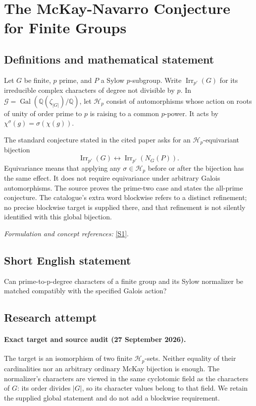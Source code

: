 \documentclass[11pt]{article}
\begin{document}
\section*{\texorpdfstring{The McKay-Navarro Conjecture for Finite Groups}{The McKay-Navarro Conjecture for Finite Groups}}\label{495}
\subsection{Definitions and mathematical statement}
Let $G$ be finite, $p$ prime, and $P$ a Sylow $p$-subgroup. Write $\operatorname{Irr}_{p'}(G)$ for its irreducible complex characters of degree not divisible by $p$. In $\mathcal G=\operatorname{Gal}({\mathbb{Q}}(\zeta_{|G|})/{\mathbb{Q}})$, let $\mathcal H_p$ consist of automorphisms whose action on roots of unity of order prime to $p$ is raising to a common $p$-power. It acts by $\chi^\sigma(g)=\sigma(\chi(g))$.

The standard conjecture stated in the cited paper asks for an $\mathcal H_p$-equivariant bijection
\[
 \operatorname{Irr}_{p'}(G)\longleftrightarrow
 \operatorname{Irr}_{p'}(N_G(P)).
\]
Equivariance means that applying any $\sigma\in\mathcal H_p$ before or after the bijection has the same effect. It does not require equivariance under arbitrary Galois automorphisms. The source proves the prime-two case and states the all-prime conjecture. The catalogue's extra word blockwise refers to a distinct refinement; no precise blockwise target is supplied there, and that refinement is not silently identified with this global bijection.
\par\smallskip\textit{Formulation and concept references:} \href{https://arxiv.org/abs/2211.14237}{[S1]}.

\subsection{Short English statement}
Can prime-to-p-degree characters of a finite group and its Sylow normalizer be matched compatibly with the specified Galois action?
\subsection{Research attempt}

\paragraph{Exact target and source audit (27 September 2026).}
The target is an isomorphism of two finite $\mathcal H_p$-sets. Neither
equality of their cardinalities nor an arbitrary ordinary McKay bijection
is enough. The normalizer's characters are viewed in the same cyclotomic
field as the characters of $G$: its order divides $|G|$, so its character
values belong to that field. We retain the supplied global statement and
do not add a blockwise requirement.
\end{document}
